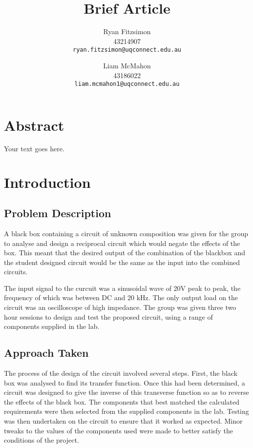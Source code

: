 \documentclass[12pt]{article} %
\title{Brief Article}
\author{
	{Ryan Fitzsimon}\\
	{43214907}\\
	\texttt{ryan.fitzsimon@uqconnect.edu.au}
	\and
	{Liam McMahon}\\
	{43186022}\\
	\texttt{liam.mcmahon1@uqconnect.edu.au}
}
\begin{document}
\maketitle
\pagebreak





\section*{Abstract}
Your text goes here.
\pagebreak





\tableofcontents
\pagebreak





\section{Introduction}
\subsection{Problem Description}

A black box containing a circuit of unknown composition was given for the group to analyse and design a reciprocal circuit which would negate the effects of the box. This meant that the desired output of the combination of the blackbox and the student designed circuit would be the same as the input into the combined circuits. 


The input signal to the curcuit was a sinusoidal wave of 20V peak to peak, the frequency of which was between DC and 20 kHz. The only output load on the circuit was an oscilloscope of high impedance. The group was given three two hour sessions to design and test the proposed circuit, using a range of components supplied in the lab.



\subsection{Approach Taken}

The process of the design of the circuit involved several steps. First, the black box was analysed to find its transfer function. Once this had been determined, a circuit was designed to give the inverse of this transverse function so as to reverse the effects of the black box. The components that best matched the calculated requirements were then selected from the supplied components in the lab. Testing was then undertaken on the circuit to ensure that it worked as expected. Minor tweaks to the values of the components used were made to better satisfy the conditions of the project.
\end{document}
